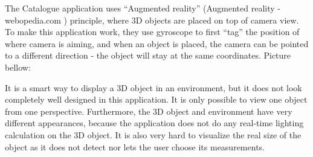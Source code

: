 The Catalogue application uses “Augmented reality” (Augmented reality - webopedia.com ) principle, where 3D objects are placed on top of camera view. To make this application work, they use gyroscope to first “tag” the position of where camera is aiming, and when an object is placed, the camera can be pointed to a different direction - the object will stay at the same coordinates. Picture bellow:

It is a smart way to display a 3D object in an environment, but it does not look completely well designed in this application. It is only possible to view one object from one perspective. Furthermore, the 3D object and environment have very different appearances, because the application does not do any real-time lighting calculation on the 3D object. It is also very hard to visualize the real size of the object as it does not detect nor lets the user choose its measurements.
